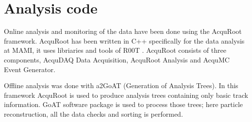 \section{Analysis code}

\indent Online analysis and monitoring of the data have been done using the AcquRoot framework. AcquRoot has been written in C++ specifically for the data analysis at MAMI, it uses libriaries and tools of R00T \cite{john, root}. AcquRoot consists of three components, AcquDAQ Data Acquisition, AcquRoot Analysis and AcquMC Event Generator.

\indent Offline analysis was done with a2GoAT (Generation of Analysis Trees). In this framework AcquRoot is used to produce analysis trees containing only basic track information. GoAT software package is used to process those trees; here particle reconstruction, all the data checks and sorting is performed.

